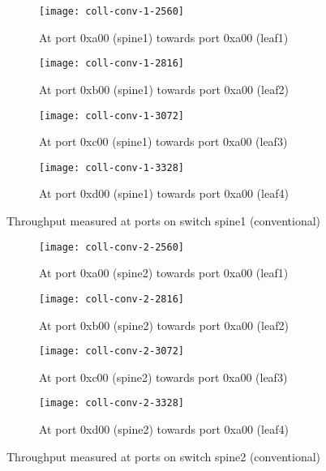 \begin{figure}[htbp]
    \centering
    \begin{subfigure}[b]{.24\linewidth}
        \texttt{[image: coll-conv-1-2560]}
        \caption{At port 0xa00 (spine1) \newline towards port 0xa00 (leaf1)}%
        \label{fig:spine1-leaf1-conv}
    \end{subfigure}
    \begin{subfigure}[b]{.24\linewidth}
        \texttt{[image: coll-conv-1-2816]}
        \caption{At port 0xb00 (spine1) \newline towards port 0xa00 (leaf2)}%
        \label{fig:spine1-leaf1-conv}
    \end{subfigure}
    \begin{subfigure}[b]{.24\linewidth}
        \texttt{[image: coll-conv-1-3072]}
        \caption{At port 0xc00 (spine1) \newline towards port 0xa00 (leaf3)}%
        \label{fig:spine1-leaf1-conv}
    \end{subfigure}
    \begin{subfigure}[b]{.24\linewidth}
        \texttt{[image: coll-conv-1-3328]}
        \caption{At port 0xd00 (spine1) \newline towards port 0xa00 (leaf4)}%
        \label{fig:spine1-leaf1-conv}
    \end{subfigure}
    \caption{Throughput measured at ports on switch spine1 (conventional)}
    \label{fig:coll-spine1-conv}
    \begin{subfigure}[b]{.24\linewidth}
        \texttt{[image: coll-conv-2-2560]}
        \caption{At port 0xa00 (spine2) \newline towards port 0xa00 (leaf1)}%
        \label{fig:spine1-leaf1-conv}
    \end{subfigure}
    \begin{subfigure}[b]{.24\linewidth}
        \texttt{[image: coll-conv-2-2816]}
        \caption{At port 0xb00 (spine2) \newline towards port 0xa00 (leaf2)}%
        \label{fig:spine1-leaf1-conv}
    \end{subfigure}
    \begin{subfigure}[b]{.24\linewidth}
        \texttt{[image: coll-conv-2-3072]}
        \caption{At port 0xc00 (spine2) \newline towards port 0xa00 (leaf3)}%
        \label{fig:spine1-leaf1-conv}
    \end{subfigure}
    \begin{subfigure}[b]{.24\linewidth}
        \texttt{[image: coll-conv-2-3328]}
        \caption{At port 0xd00 (spine2) \newline towards port 0xa00 (leaf4)}%
        \label{fig:spine1-leaf1-conv}
    \end{subfigure}
    \caption{Throughput measured at ports on switch spine2 (conventional)}
    \label{fig:coll-spine2-conv}
\end{figure}

